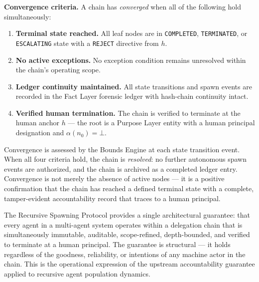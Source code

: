 \medskip
\noindent\textbf{Convergence criteria.} A chain has \emph{converged} when all of the following hold simultaneously:

\begin{enumerate}
    \item[(C1)] \textbf{Terminal state reached.} All leaf nodes are in \texttt{COMPLETED}, \texttt{TERMINATED}, or \texttt{ESCALATING} state with a \texttt{REJECT} directive from $h$.

    \item[(C2)] \textbf{No active exceptions.} No exception condition remains unresolved within the chain's operating scope.

    \item[(C3)] \textbf{Ledger continuity maintained.} All state transitions and spawn events are recorded in the Fact Layer forensic ledger with hash-chain continuity intact.

    \item[(C4)] \textbf{Verified human termination.} The chain is verified to terminate at the human anchor $h$ — the root is a Purpose Layer entity with a human principal designation and $\alpha(n_0) = \bot$.
\end{enumerate}

Convergence is assessed by the Bounds Engine at each state transition event. When all four criteria hold, the chain is \emph{resolved}: no further autonomous spawn events are authorized, and the chain is archived as a completed ledger entry. Convergence is not merely the absence of active nodes — it is a positive confirmation that the chain has reached a defined terminal state with a complete, tamper-evident accountability record that traces to a human principal.

\medskip
The Recursive Spawning Protocol provides a single architectural guarantee: that every agent in a multi-agent system operates within a delegation chain that is simultaneously immutable, auditable, scope-refined, depth-bounded, and verified to terminate at a human principal. The guarantee is structural — it holds regardless of the goodness, reliability, or intentions of any machine actor in the chain. This is the operational expression of the upstream \bxthree{} accountability guarantee applied to recursive agent population dynamics.
